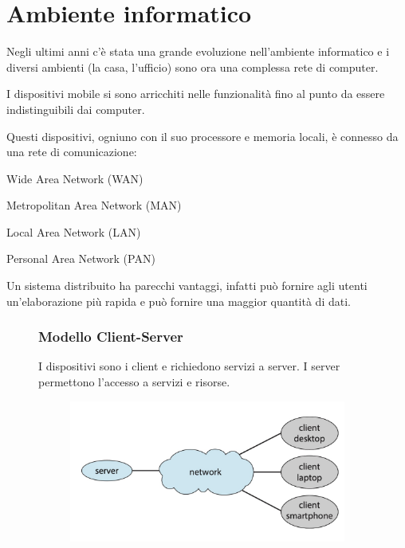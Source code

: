 \section{Ambiente informatico}
Negli ultimi anni c'è stata una grande evoluzione nell'ambiente informatico e i diversi ambienti (la casa, l'ufficio) sono ora una complessa rete di computer.

I dispositivi mobile si sono arricchiti nelle funzionalità fino al punto da essere indistinguibili dai computer.

\spacer
Questi dispositivi, ogniuno con il suo processore e memoria locali, è connesso da una rete di comunicazione:
\begin{sitemize}
    \item Wide Area Network (WAN)
    \item Metropolitan Area Network (MAN)
    \item Local Area Network (LAN)
    \item Personal Area Network (PAN)
\end{sitemize}

\spacer
Un sistema distribuito ha parecchi vantaggi, infatti può fornire agli utenti un'elaborazione più rapida e può fornire una maggior quantità di dati.

\begin{figure}[H]
    \begin{minipage}{0.55\textwidth}
        \subsubsection*{Modello Client-Server}
        I dispositivi sono i client e richiedono servizi a server. I server permettono l'accesso a servizi e risorse.
    \end{minipage}
    \hfill
    \begin{minipage}{0.35\textwidth}
        \begin{figure}[H]
            \centering
            \includegraphics[width=1\linewidth]{assets/client-server.jpg}
        \end{figure}
    \end{minipage}
\end{figure}

